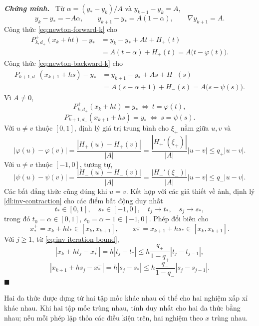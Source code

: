 \documentclass[12pt,a4paper,oneside]{book}
\numberwithin{algorithm}{chapter}
\theoremstyle{definition}
\newenvironment{chungminh}{\par\medskip\noindent\textbf{\textit{\color{mainblue}Chứng minh.}}\ }{\hfill$\blacksquare$\par\medskip}
\begin{document}
\begin{chungminh}
Từ $\alpha=(y_\ast-y_k)/A$ và $y_{k+1}-y_k=A$,
\[
 y_k-y_\ast=-A\alpha,\qquad
 y_{k+1}-y_\ast=A(1-\alpha),\qquad
 \nabla y_{k+1}=A.
\]
Công thức \eqref{eq:newton-forward-k} cho
\begin{align*}
 P_{k,d_+}^{+}(x_k+ht)-y_\ast
 &=y_k-y_\ast+At+H_+(t)\\
 &=A(t-\alpha)+H_+(t)
 =A\bigl(t-\varphi(t)\bigr).
\end{align*}
Công thức \eqref{eq:newton-backward-k} cho
\begin{align*}
 P_{k+1,d_-}^{-}(x_{k+1}+hs)-y_\ast
 &=y_{k+1}-y_\ast+As+H_-(s)\\
 &=A(s-\alpha+1)+H_-(s)
 =A\bigl(s-\psi(s)\bigr).
\end{align*}
Vì $A\ne0$,
\[
 P_{k,d_+}^{+}(x_k+ht)=y_\ast\ \Longleftrightarrow\ t=\varphi(t),
\]
\[
 P_{k+1,d_-}^{-}(x_{k+1}+hs)=y_\ast\ \Longleftrightarrow\ s=\psi(s).
\]
Với $u\ne v$ thuộc $[0,1]$, định lý giá trị trung bình cho
$\xi_+$ nằm giữa $u,v$ và
\[
 |\varphi(u)-\varphi(v)|
 =\frac{|H_+(u)-H_+(v)|}{|A|}
 =\frac{|H_+'(\xi_+)|}{|A|}|u-v|
 \leq q_+|u-v|.
\]
Với $u\ne v$ thuộc $[-1,0]$, tương tự,
\[
 |\psi(u)-\psi(v)|
 =\frac{|H_-(u)-H_-(v)|}{|A|}
 =\frac{|H_-'(\xi_-)|}{|A|}|u-v|
 \leq q_-|u-v|.
\]
Các bất đẳng thức cũng đúng khi $u=v$. Kết hợp với các giả thiết về ảnh, định lý \ref{dl:inv-contraction} cho các điểm bất động duy nhất
\[
 t_\ast\in[0,1],\quad s_\ast\in[-1,0],\quad
 t_j\to t_\ast,\quad s_j\to s_\ast,
\]
trong đó $t_0=\alpha\in[0,1]$, $s_0=\alpha-1\in[-1,0]$.
Phép đổi biến cho
\[
 x_\ast^+=x_k+ht_\ast\in[x_k,x_{k+1}],\qquad
 x_\ast^-=x_{k+1}+hs_\ast\in[x_k,x_{k+1}].
\]
Với $j\geq1$, từ \eqref{eq:inv-iteration-bound},
\[
 |x_k+ht_j-x_\ast^+|
 =h|t_j-t_\ast|
 \leq h\frac{q_+}{1-q_+}|t_j-t_{j-1}|,
\]
\[
 |x_{k+1}+hs_j-x_\ast^-|
 =h|s_j-s_\ast|
 \leq h\frac{q_-}{1-q_-}|s_j-s_{j-1}|.
\]
\end{chungminh}
Hai đa thức được dựng từ hai tập mốc khác nhau có thể cho hai nghiệm xấp xỉ khác nhau. Khi hai tập mốc trùng nhau, tính duy nhất cho hai đa thức bằng nhau; nếu mỗi phép lặp thỏa các điều kiện trên, hai nghiệm theo $x$ trùng nhau.
\end{document}
